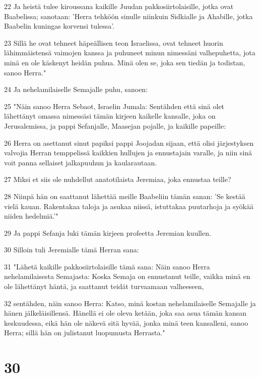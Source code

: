\par 22 Ja heistä tulee kiroussana kaikille Juudan pakkosiirtolaisille, jotka ovat Baabelissa; sanotaan: 'Herra tehköön sinulle niinkuin Sidkialle ja Ahabille, jotka Baabelin kuningas korvensi tulessa'.
\par 23 Sillä he ovat tehneet häpeällisen teon Israelissa, ovat tehneet huorin lähimmäistensä vaimojen kanssa ja puhuneet minun nimessäni valhepuhetta, jota minä en ole käskenyt heidän puhua. Minä olen se, joka sen tiedän ja todistan, sanoo Herra."
\par 24 Ja nehelamilaiselle Semajalle puhu, sanoen:
\par 25 "Näin sanoo Herra Sebaot, Israelin Jumala: Sentähden että sinä olet lähettänyt omassa nimessäsi tämän kirjeen kaikelle kansalle, joka on Jerusalemissa, ja pappi Sefanjalle, Maasejan pojalle, ja kaikille papeille:
\par 26 Herra on asettanut sinut papiksi pappi Joojadan sijaan, että olisi järjestyksen valvojia Herran temppelissä kaikkien hullujen ja ennustajain varalle, ja niin sinä voit panna sellaiset jalkapuuhun ja kaularautaan.
\par 27 Miksi et siis ole nuhdellut anatotilaista Jeremiaa, joka ennustaa teille?
\par 28 Niinpä hän on saattanut lähettää meille Baabeliin tämän sanan: 'Se kestää vielä kauan. Rakentakaa taloja ja asukaa niissä, istuttakaa puutarhoja ja syökää niiden hedelmiä.'"
\par 29 Ja pappi Sefanja luki tämän kirjeen profeetta Jeremian kuullen.
\par 30 Silloin tuli Jeremialle tämä Herran sana:
\par 31 "Lähetä kaikille pakkosiirtolaisille tämä sana: Näin sanoo Herra nehelamilaisesta Semajasta: Koska Semaja on ennustanut teille, vaikka minä en ole lähettänyt häntä, ja saattanut teidät turvaamaan valheeseen,
\par 32 sentähden, näin sanoo Herra: Katso, minä kostan nehelamilaiselle Semajalle ja hänen jälkeläisillensä. Hänellä ei ole oleva ketään, joka saa asua tämän kansan keskuudessa, eikä hän ole näkevä sitä hyvää, jonka minä teen kansalleni, sanoo Herra; sillä hän on julistanut luopumusta Herrasta."

\chapter{30}

